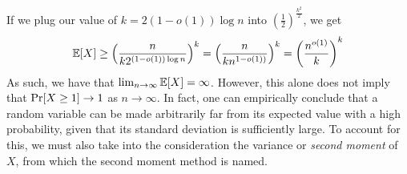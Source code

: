 \documentclass{article}
\begin{document}
If we plug our value of $k = 2(1 - o(1)) \log{n}$ into
$\left(\frac{1}{2}\right)^{\frac{k^{2}}{2}}$, we get
\begin{equation*}
    \mathbb{E}[X] \geq
    \left(\frac{n}{k 2^{(1 - o(1)) \log{n}}}\right)^{k} = \left(\frac{n}{kn^{1 -
    o(1))}}\right)^{k} = \left(\frac{n^{o(1)}}{k}\right)^{k}
\end{equation*}
As such, we have that $\lim_{n \to \infty} \mathbb{E}[X] = \infty$. However, this
alone does not imply that $\textup{Pr}[X \geq 1] \to 1$ as $n \to \infty$. In fact, one
can empirically conclude that a
random variable can be made arbitrarily far from its expected value with a high
probability, given that its standard deviation is sufficiently large. To
account for this, we must also take into the consideration the variance or \emph{second
moment} of $X$, from which the second moment method is named.
\end{document}
